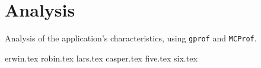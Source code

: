 \documentclass[final]{report}
\begin{document}
\chapter{Analysis}
Analysis of the application's characteristics, using \texttt{gprof} and \texttt{MCProf}.

{erwin.tex}
{robin.tex}
{lars.tex}
{casper.tex}
{five.tex}
{six.tex}
\end{document}
